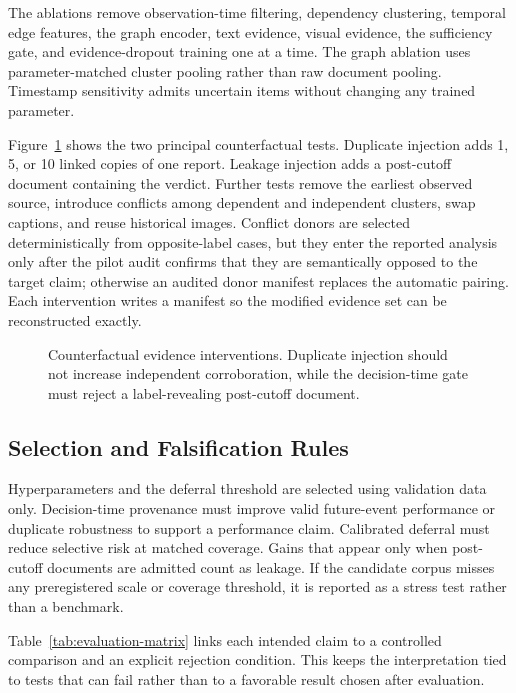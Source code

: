 The ablations remove observation-time filtering, dependency clustering, temporal edge features, the graph encoder, text evidence, visual evidence, the sufficiency gate, and evidence-dropout training one at a time. The graph ablation uses parameter-matched cluster pooling rather than raw document pooling. Timestamp sensitivity admits uncertain items without changing any trained parameter.

Figure~\ref{fig:interventions} shows the two principal counterfactual tests. Duplicate injection adds 1, 5, or 10 linked copies of one report. Leakage injection adds a post-cutoff document containing the verdict. Further tests remove the earliest observed source, introduce conflicts among dependent and independent clusters, swap captions, and reuse historical images. Conflict donors are selected deterministically from opposite-label cases, but they enter the reported analysis only after the pilot audit confirms that they are semantically opposed to the target claim; otherwise an audited donor manifest replaces the automatic pairing. Each intervention writes a manifest so the modified evidence set can be reconstructed exactly.

\begin{figure}[t]
\centering
\resizebox{\columnwidth}{!}{}
\caption{Counterfactual evidence interventions. Duplicate injection should not increase independent corroboration, while the decision-time gate must reject a label-revealing post-cutoff document.}
\label{fig:interventions}
\end{figure}

\subsection{Selection and Falsification Rules}

Hyperparameters and the deferral threshold are selected using validation data only. Decision-time provenance must improve valid future-event performance or duplicate robustness to support a performance claim. Calibrated deferral must reduce selective risk at matched coverage. Gains that appear only when post-cutoff documents are admitted count as leakage. If the candidate corpus misses any preregistered scale or coverage threshold, it is reported as a stress test rather than a benchmark.

Table~\ref{tab:evaluation-matrix} links each intended claim to a controlled comparison and an explicit rejection condition. This keeps the interpretation tied to tests that can fail rather than to a favorable result chosen after evaluation.

